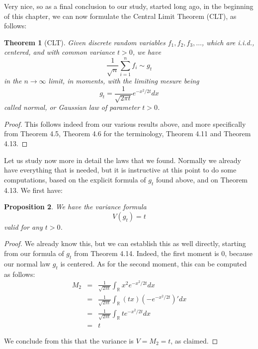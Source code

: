\documentclass[12pt]{amsbook}
\newtheorem{theorem}{Theorem}[chapter]
\newtheorem{proposition}[theorem]{Proposition}
\begin{document}
Very nice, so as a final conclusion to our study, started long ago, in the beginning of this chapter, we can now formulate the Central Limit Theorem (CLT), as follows:


\begin{theorem}[CLT]
Given discrete random variables $f_1,f_2,f_3,\ldots$, which are i.i.d., centered, and with common variance $t>0$, we have
$$\frac{1}{\sqrt{n}}\sum_{i=1}^nf_i\sim g_t$$
in the $n\to\infty$ limit, in moments, with the limiting mesure being
$$g_t=\frac{1}{\sqrt{2\pi t}}e^{-x^2/2t}dx$$
called normal, or Gaussian law of parameter $t>0$.
\end{theorem}

\begin{proof}
This follows indeed from our various results above, and more specifically from Theorem 4.5, Theorem 4.6 for the terminology, Theorem 4.11 and Theorem 4.13.
\end{proof}

Let us study now more in detail the laws that we found. Normally we already have everything that is needed, but it is instructive at this point to do some computations, based on the explicit formula of $g_t$ found above, and on Theorem 4.13. We first have: 


\begin{proposition}
We have the variance formula
$$V(g_t)=t$$
valid for any $t>0$.
\end{proposition}

\begin{proof}
We already know this, but we can establish this as well directly, starting from our formula of $g_t$ from Theorem 4.14. Indeed, the first moment is 0, because our normal law $g_t$ is centered. As for the second moment, this can be computed as follows:
\begin{eqnarray*}
M_2
&=&\frac{1}{\sqrt{2\pi t}}\int_\mathbb Rx^2e^{-x^2/2t}dx\\
&=&\frac{1}{\sqrt{2\pi t}}\int_\mathbb R(tx)\left(-e^{-x^2/2t}\right)'dx\\
&=&\frac{1}{\sqrt{2\pi t}}\int_\mathbb Rte^{-x^2/2t}dx\\
&=&t
\end{eqnarray*}

We conclude from this that the variance is $V=M_2=t$, as claimed.
\end{proof}
\end{document}
